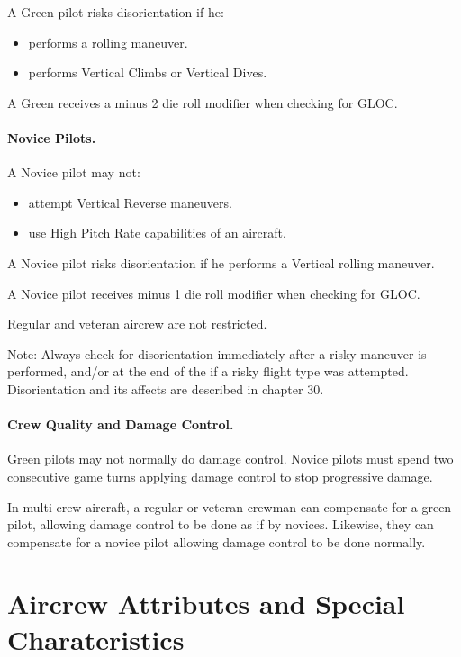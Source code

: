 \begin{advancedrules}
A Green pilot risks disorientation if he:
\begin{itemize}
    \item performs a rolling maneuver.
    \item performs Vertical Climbs or Vertical Dives.
\end{itemize}

A Green  receives a minus 2 die roll modifier when checking for GLOC.

\paragraph{Novice Pilots.} A Novice pilot may not:

\begin{itemize}
    \item attempt Vertical Reverse maneuvers.
    \item use High Pitch Rate capabilities of an aircraft.
\end{itemize}

A Novice pilot risks disorientation if he performs a Vertical rolling maneuver.

A Novice pilot receives minus 1 die roll modifier when checking for GLOC.

Regular and veteran aircrew are not restricted.

Note: Always check for disorientation immediately after a risky maneuver is performed, and/or at the end of the  if a risky flight type was attempted. Disorientation and its affects are described in chapter 30.

\paragraph{Crew Quality and Damage Control.} Green pilots may not normally do damage control. Novice pilots must spend two consecutive game turns applying damage control to stop progressive damage.

In multi-crew aircraft, a regular or veteran crewman can compensate for a green pilot, allowing damage control to be done as if by novices. Likewise, they can compensate for a novice pilot allowing damage control to be done normally.

\section{Aircrew Attributes and Special Charateristics}
\label{rule:crew-attributes}
\label{rule:crew-characteristics}


\end{advancedrules}
